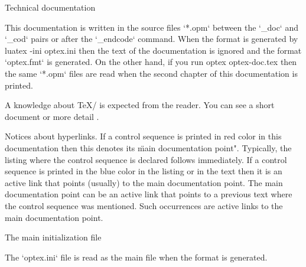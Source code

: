



\chap Technical documentation

This documentation is written in the source files `*.opm` between
the `\_doc` and `\_cod` pairs or after the `\_endcode` command.
When the format is generated by
\begtt
luatex -ini optex.ini
\endtt
then the text of the documentation is ignored and the format `optex.fmt` is
generated. On the other hand, if you run
\begtt
optex optex-doc.tex
\endtt
then the same `*.opm` files are read when the second chapter of this
documentation is printed.

A knowledge about \TeX/ is expected from the reader.
You can see a short document
or more detail
.

Notices about hyperlinks.
If a control sequence is printed in red color in this documentation then
this denotes its \"main documentation point". Typically, the listing where
the control sequence is declared follows immediately. If a control sequence is
printed in the blue color in the listing or in the text
then it is an active link that points (usually) to the main documentation point.
The main documentation point can be an active link that points to a previous
text where the control sequence was
mentioned. Such occurrences are active links to the main documentation point.

\sec[init] The main initialization file

The `optex.ini` file is read as the main file when the format is generated.

